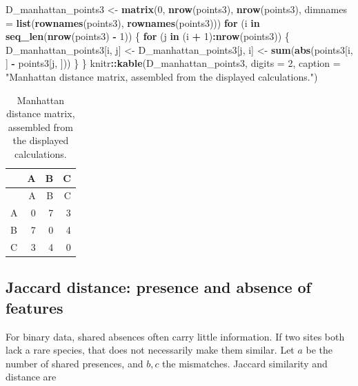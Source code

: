 \documentclass[
  english,
]{article}
\newenvironment{Shaded}{\begin{snugshade}}{\end{snugshade}}
\newcommand{\AttributeTok}[1]{\textcolor[rgb]{0.13,0.29,0.53}{#1}}
\newcommand{\ControlFlowTok}[1]{\textcolor[rgb]{0.13,0.29,0.53}{\textbf{#1}}}
\newcommand{\DecValTok}[1]{\textcolor[rgb]{0.00,0.00,0.81}{#1}}
\newcommand{\FunctionTok}[1]{\textcolor[rgb]{0.13,0.29,0.53}{\textbf{#1}}}
\newcommand{\NormalTok}[1]{#1}
\newcommand{\OtherTok}[1]{\textcolor[rgb]{0.56,0.35,0.01}{#1}}
\newcommand{\SpecialCharTok}[1]{\textcolor[rgb]{0.81,0.36,0.00}{\textbf{#1}}}
\newcommand{\StringTok}[1]{\textcolor[rgb]{0.31,0.60,0.02}{#1}}
\begin{document}
\begin{Shaded}
\begin{Highlighting}[]
\NormalTok{D\_manhattan\_points3 }\OtherTok{\textless{}{-}} \FunctionTok{matrix}\NormalTok{(}\DecValTok{0}\NormalTok{, }\FunctionTok{nrow}\NormalTok{(points3), }\FunctionTok{nrow}\NormalTok{(points3),}
                              \AttributeTok{dimnames =} \FunctionTok{list}\NormalTok{(}\FunctionTok{rownames}\NormalTok{(points3), }\FunctionTok{rownames}\NormalTok{(points3)))}
\ControlFlowTok{for}\NormalTok{ (i }\ControlFlowTok{in} \FunctionTok{seq\_len}\NormalTok{(}\FunctionTok{nrow}\NormalTok{(points3) }\SpecialCharTok{{-}} \DecValTok{1}\NormalTok{)) \{}
  \ControlFlowTok{for}\NormalTok{ (j }\ControlFlowTok{in}\NormalTok{ (i }\SpecialCharTok{+} \DecValTok{1}\NormalTok{)}\SpecialCharTok{:}\FunctionTok{nrow}\NormalTok{(points3)) \{}
\NormalTok{    D\_manhattan\_points3[i, j] }\OtherTok{\textless{}{-}}\NormalTok{ D\_manhattan\_points3[j, i] }\OtherTok{\textless{}{-}}
      \FunctionTok{sum}\NormalTok{(}\FunctionTok{abs}\NormalTok{(points3[i, ] }\SpecialCharTok{{-}}\NormalTok{ points3[j, ]))}
\NormalTok{  \}}
\NormalTok{\}}
\NormalTok{knitr}\SpecialCharTok{::}\FunctionTok{kable}\NormalTok{(D\_manhattan\_points3, }\AttributeTok{digits =} \DecValTok{2}\NormalTok{,}
             \AttributeTok{caption =} \StringTok{"Manhattan distance matrix, assembled from the displayed calculations."}\NormalTok{)}
\end{Highlighting}
\end{Shaded}

\begin{longtable}[]{@{}lrrr@{}}
\caption{Manhattan distance matrix, assembled from the displayed
calculations.}\tabularnewline
\toprule\noalign{}
& A & B & C \\
\midrule\noalign{}
\endfirsthead
\toprule\noalign{}
& A & B & C \\
\midrule\noalign{}
\endhead
\bottomrule\noalign{}
\endlastfoot
A & 0 & 7 & 3 \\
B & 7 & 0 & 4 \\
C & 3 & 4 & 0 \\
\end{longtable}

\subsection{Jaccard distance: presence and absence of
features}\label{jaccard-distance-presence-and-absence-of-features}

For binary data, shared absences often carry little information. If two
sites both lack a rare species, that does not necessarily make them
similar. Let \(a\) be the number of shared presences, and \(b,c\) the
mismatches. Jaccard similarity and distance are
\end{document}
